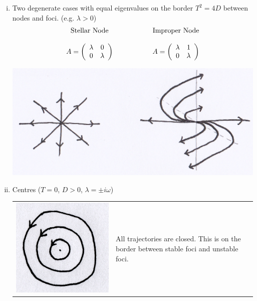 \documentclass{article}
\begin{document}
\begin{enumerate}[(i)]
\item Two degenerate cases with equal eigenvalues on the border $T^2 = 4D$
between nodes and foci. (e.g. $\lambda > 0$)
\[\begin{array}{c@{\hspace{2cm}}c}
\mbox{Stellar Node} & \mbox{Improper Node} \\ \\
  A = \left( \begin{array}{cc}
		\lambda & 0 \\
		 0 & \lambda \end{array} \right)  & 
  A = \left( \begin{array}{cc}
		\lambda & 1 \\
		 0 & \lambda \end{array} \right)   \\
\end{array}
\]
\begin{center}
\hspace{1mm} \includegraphics[scale=0.15]{fig95.png}
\end{center}
\item Centres ($T=0$, $D>0$, $\lambda = \pm i \omega$)
\\
\begin{tabular}{ m{4.5cm} m{8cm}  } 
\includegraphics[scale = 0.15]{fig11.png}  & 
All trajectories are closed. This is on the border between stable foci and
unstable foci.
\end{tabular}


\end{enumerate}
\end{document}
